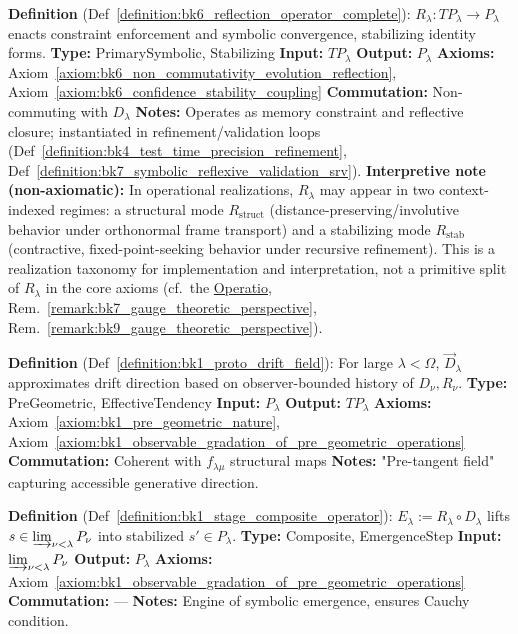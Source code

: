 \begin{description}[leftmargin=2.5cm, style=nextline]
\item[\textbf{Symbolic Reflection Operator} \hfill \( R_{\lambda} \)] 
\label{dict:appA_symbolic_reflection_operator}
\textbf{Definition} (Def~\ref{definition:bk6_reflection_operator_complete}): \( R_{\lambda} : T P_\lambda \rightarrow P_\lambda \) enacts constraint enforcement and symbolic convergence, stabilizing identity forms.
\textbf{Type:} PrimarySymbolic, Stabilizing
\textbf{Input:} \( T P_\lambda \)
\textbf{Output:} \( P_\lambda \)
\textbf{Axioms:} Axiom~\ref{axiom:bk6_non_commutativity_evolution_reflection}, Axiom~\ref{axiom:bk6_confidence_stability_coupling}
\textbf{Commutation:} Non-commuting with \( D_{\lambda} \)
\textbf{Notes:} Operates as memory constraint and reflective closure; instantiated in refinement/validation loops (Def~\ref{definition:bk4_test_time_precision_refinement}, Def~\ref{definition:bk7_symbolic_reflexive_validation_srv}).
\textbf{Interpretive note (non-axiomatic):} In operational realizations, \( R_{\lambda} \) may appear in two context-indexed regimes: a structural mode \(R_{\mathrm{struct}}\) (distance-preserving/involutive behavior under orthonormal frame transport) and a stabilizing mode \(R_{\mathrm{stab}}\) (contractive, fixed-point-seeking behavior under recursive refinement). This is a realization taxonomy for implementation and interpretation, not a primitive split of \( R_{\lambda} \) in the core axioms (cf.~the \hyperref[sec:bk1_operatio]{Operatio}, Rem.~\ref{remark:bk7_gauge_theoretic_perspective}, Rem.~\ref{remark:bk9_gauge_theoretic_perspective}).

\item[\textbf{Proto--Drift Field} \hfill \( \vec{D}_{\lambda} \)] 
\label{dict:appA_proto_drift_field}
\textbf{Definition} (Def~\ref{definition:bk1_proto_drift_field}): For large \( \lambda < \Omega \), \( \vec{D}_{\lambda} \) approximates drift direction based on observer-bounded history of \( D_\nu, R_\nu \).
\textbf{Type:} PreGeometric, EffectiveTendency
\textbf{Input:} \( P_\lambda \)
\textbf{Output:} \( T P_\lambda \)
\textbf{Axioms:} Axiom~\ref{axiom:bk1_pre_geometric_nature}, Axiom~\ref{axiom:bk1_observable_gradation_of_pre_geometric_operations}
\textbf{Commutation:} Coherent with \( f_{\lambda\mu} \) structural maps
\textbf{Notes:} "Pre-tangent field" capturing accessible generative direction.

\item[\textbf{Stage--Composite Operator} \hfill \( E_{\lambda} \)] 
\label{dict:appA_stage_composite_operator}
\textbf{Definition} (Def~\ref{definition:bk1_stage_composite_operator}): \( E_{\lambda} := R_{\lambda} \circ D_{\lambda} \) lifts \( s \in \varinjlim_{\nu<\lambda} P_\nu \) into stabilized \( s' \in P_\lambda \).
\textbf{Type:} Composite, EmergenceStep
\textbf{Input:} \( \varinjlim_{\nu<\lambda} P_\nu \)
\textbf{Output:} \( P_\lambda \)
\textbf{Axioms:} Axiom~\ref{axiom:bk1_observable_gradation_of_pre_geometric_operations}
\textbf{Commutation:} ---
\textbf{Notes:} Engine of symbolic emergence, ensures Cauchy condition.


\end{description}
